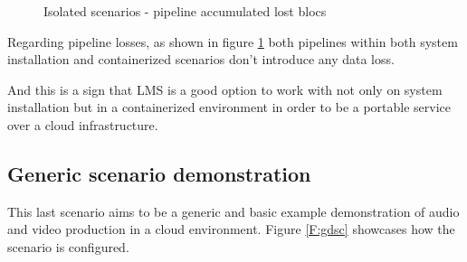 \begin{figure}[!htb]
\begin{center}
\begin{subfigmatrix}{2}
    \end{subfigmatrix}
    \caption{Isolated scenarios - pipeline accumulated lost blocs}
    \label{F:isoaplb}
  \end{center}
\end{figure} 

Regarding pipeline losses, as shown in figure \ref{F:isoaplb} both pipelines within both system installation and containerized scenarios don't introduce any data loss.

And this is a sign that LMS is a good option to work with not only on system installation but in a containerized environment in order to be a portable service over a cloud infrastructure.

\subsection{Generic scenario demonstration}

This last scenario aims to be a generic and basic example demonstration of audio and video production in a cloud environment. Figure \ref{F:gdsc} showcases how the scenario is configured.

